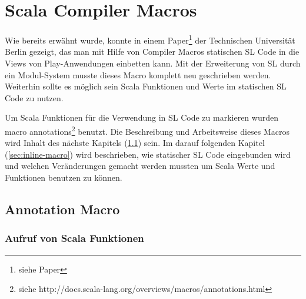 \documentclass[12pt,a4paper]{report}
\begin{document}
\chapter{Scala Compiler Macros}
\label{chap:scala-compiler-macros}

Wie bereits erwähnt wurde, konnte in einem Paper\footnote{siehe Paper} der Technischen Universität Berlin gezeigt, das man mit Hilfe von Compiler Macros statischen \ac{SL} Code in die Views von Play-Anwendungen einbetten kann. Mit der Erweiterung von \ac{SL} durch ein Modul-System musste dieses Macro komplett neu geschrieben werden. Weiterhin sollte es möglich sein Scala Funktionen und Werte im statischen \ac{SL} Code zu nutzen. 

Um Scala Funktionen für die Verwendung in \ac{SL} Code zu markieren wurden macro annotations\footnote{siehe http://docs.scala-lang.org/overviews/macros/annotations.html} benutzt. Die Beschreibung und Arbeitsweise dieses Macros wird Inhalt des nächste Kapitels (\ref{sec:annotation-macro}) sein. Im darauf folgenden Kapitel (\ref{sec:inline-macro}) wird beschrieben, wie statischer \ac{SL} Code eingebunden wird und welchen Veränderungen gemacht werden mussten um Scala Werte und Funktionen benutzen zu können.


\section{Annotation Macro}
\label{sec:annotation-macro}



\subsection{Aufruf von Scala Funktionen}
\label{subs:call-scala-functions}

\end{document}
